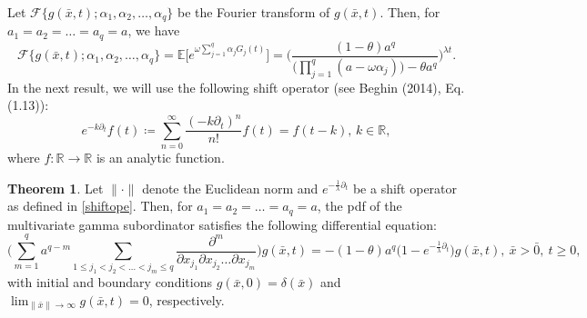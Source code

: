 \documentclass[12pt,oneside,reqno]{amsart}
\numberwithin{equation}{section}
\theoremstyle{definition}
\numberwithin{equation}{section}
\newtheorem{theorem}{\bf Theorem}[section]
\theoremstyle{remarkstyle}
\begin{document}
Let $\mathcal{F}\{g(\bar{x},t);\alpha_1,\alpha_2,\dots,\alpha_q\}$ be the Fourier transform of $g(\bar{x},t)$. Then, for $a_1=a_2=\dots=a_q=a$, we have
\begin{equation}\label{fourier}
\mathcal{F}\{g(\bar{x},t);\alpha_1,\alpha_2,\dots,\alpha_q\}=\mathbb{E}\big[e^{\omega\sum_{j=1}^{q}\alpha_j G_j(t)}\big]=\bigg(\frac{(1-\theta)a^q}{\big(\prod_{j=1}^{q}(a-\omega\alpha_j)\big)-\theta a^q}\bigg)^{\lambda t}.
\end{equation}
In the next result, we will use the following shift operator (see Beghin (2014), Eq. (1.13)):
\begin{equation}\label{shiftope}
	e^{-k\partial_t}f(t)\coloneq \sum_{n=0}^{\infty}\frac{(-k\partial_t)^n}{n!}f(t)=f(t-k), \, k\in\mathbb{R},
\end{equation}
where $f\colon\mathbb{R}\to \mathbb{R}$ is an analytic function. 

\begin{theorem}
Let $\|\cdot\|$ denote the Euclidean norm and $e^{-\frac{1}{\lambda}\partial_t}$ be a shift operator as defined in \eqref{shiftope}. Then, for $a_1=a_2=\dots=a_q=a$, the pdf of the multivariate gamma subordinator satisfies the following differential equation:
{\small	\begin{equation}\label{de1}
		\Big(\sum_{m=1}^{q}a^{q-m}\sum_{1\le j_1<j_2<\dots<j_m\le q}\frac{\partial^m}{\partial x_{j_1}\partial x_{j_2}\dots\partial x_{j_m}}\Big)g(\bar{x},t)=-(1-\theta)a^q\Big(1-e^{-\frac{1}{\lambda}\partial_t}\Big)g(\bar{x},t),\ \bar{x}>\bar{0}, \  t\ge 0,
	\end{equation}}
with initial and boundary conditions $g(\bar{x},0)=\delta (\bar{x})$ and $\lim_{\|\bar{x}\|\to \infty}g(\bar{x},t)=0$, respectively.  
\end{theorem}
\end{document}
